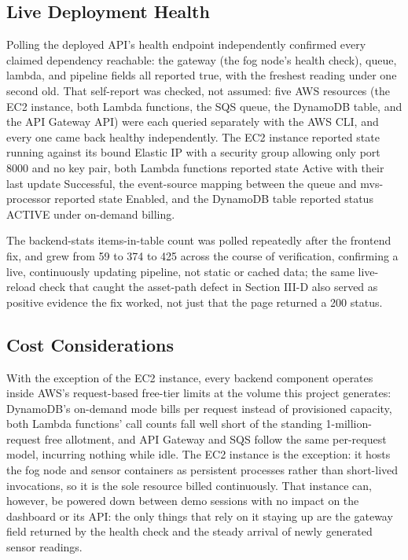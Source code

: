 \documentclass[conference]{IEEEtran}
\begin{document}
\subsection{Live Deployment Health}
Polling the deployed API's health endpoint independently confirmed every claimed dependency reachable: the gateway (the fog node's health check), queue, lambda, and pipeline fields all reported true, with the freshest reading under one second old. That self-report was checked, not assumed: five AWS resources (the EC2 instance, both Lambda functions, the SQS queue, the DynamoDB table, and the API Gateway API) were each queried separately with the AWS CLI, and every one came back healthy independently. The EC2 instance reported state running against its bound Elastic IP with a security group allowing only port 8000 and no key pair, both Lambda functions reported state Active with their last update Successful, the event-source mapping between the queue and mvs-processor reported state Enabled, and the DynamoDB table reported status ACTIVE under on-demand billing.

The backend-stats items-in-table count was polled repeatedly after the frontend fix, and grew from 59 to 374 to 425 across the course of verification, confirming a live, continuously updating pipeline, not static or cached data; the same live-reload check that caught the asset-path defect in Section III-D also served as positive evidence the fix worked, not just that the page returned a 200 status.

\subsection{Cost Considerations}
With the exception of the EC2 instance, every backend component operates inside AWS's request-based free-tier limits at the volume this project generates: DynamoDB's on-demand mode bills per request instead of provisioned capacity, both Lambda functions' call counts fall well short of the standing 1-million-request free allotment, and API Gateway and SQS follow the same per-request model, incurring nothing while idle. The EC2 instance is the exception: it hosts the fog node and sensor containers as persistent processes rather than short-lived invocations, so it is the sole resource billed continuously. That instance can, however, be powered down between demo sessions with no impact on the dashboard or its API: the only things that rely on it staying up are the gateway field returned by the health check and the steady arrival of newly generated sensor readings.
\end{document}
